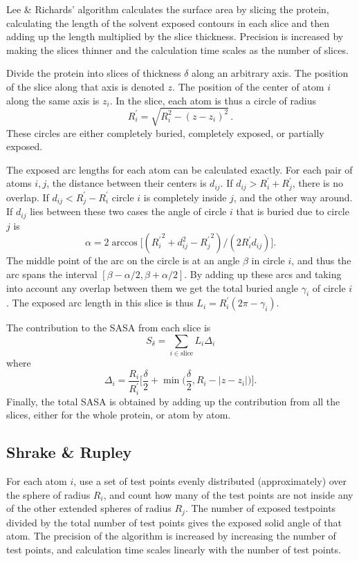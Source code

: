 \documentclass[a4paper,11pt]{article}
\begin{document}
Lee \& Richards' algorithm calculates the surface area by slicing the
protein, calculating the length of the solvent exposed contours in
each slice and then adding up the length multiplied by the slice
thickness. Precision is increased by making the slices thinner and the
calculation time scales as the number of slices.

Divide the protein into slices of thickness $\delta$ along an
arbitrary axis. The position of the slice along that axis is denoted
$z$. The position of the center of atom $i$ along the same axis is
$z_i$. In the slice, each atom is thus a circle of radius $$R_i^\prime
= \sqrt{R_i^2-(z-z_i)^2}\,.$$ These circles are either completely buried,
completely exposed, or partially exposed.

The exposed arc lengths for each atom can be calculated exactly. For
each pair of atoms $i,j$, the distance between their centers is
$d_{ij}$. If $d_{ij} > R_i^\prime + R_j^\prime$, there is no
overlap. If $d_{ij} < R_j^\prime - R_i^\prime$ circle $i$ is
completely inside $j$, and the other way around. If $d_{ij}$ lies
between these two cases the angle of circle $i$ that is buried due to
circle $j$ is $$\alpha = 2\arccos \bigl[({R_i^\prime}^2 + d_{ij}^2 -
  {R_{j}^\prime}^2)/(2R_i^\prime d_{ij})\bigr].$$ The middle point of
the arc on the circle is at an angle $\beta$ in circle $i$, and thus the
arc spans the interval $[\beta-\alpha/2,\beta+\alpha/2]$. By adding up
these arcs and taking into account any overlap between them we get
the total buried angle $\gamma_i$ of circle $i$. The exposed arc length in
this slice is thus $L_i = R_i^\prime(2\pi-\gamma_i)$.

The contribution to the SASA from each slice is $$ S_\delta =
\sum_{i \in \text{slice}}L_i\Delta_i $$ where
$$
  \Delta_i = \frac{R_i}{R_i^\prime} \biggl[\frac{\delta}{2} 
    + \min\biggl(\frac{\delta}{2},R_i -
    \lvert z - z_i \rvert\biggr)\biggr]. 
$$ 
Finally, the total SASA is obtained by adding up the contribution from
all the slices, either for the whole protein, or atom by atom.

\subsection{Shrake \& Rupley}

For each atom $i$, use a set of test points evenly distributed
(approximately) over the sphere of radius $R_i$, and count how many of
the test points are not inside any of the other extended spheres of
radius $R_j$. The number of exposed testpoints divided by the total
number of test points gives the exposed solid angle of that atom. The
precision of the algorithm is increased by increasing the number of
test points, and calculation time scales linearly with the number of
test points.
\end{document}
